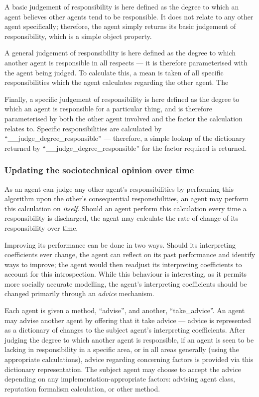 A basic judgement of responsibility is here defined as the degree to which an agent believes other agents tend to be responsible. It does not relate to any other agent specifically; therefore, the agent simply returns its basic judgement of responsibility, which is a simple object property.\par

A general judgement of responsibility is here defined as the degree to which another agent is responsible in all respects --- it is therefore parameterised with the agent being judged. To calculate this, a mean is taken of all specific responsibilities which the agent calculates regarding the other agent. The \par

Finally, a specific judgement of responsibility is here defined as the degree to which an agent is responsible for a particular thing, and is therefore parameterised by both the other agent involved and the factor the calculation relates to. Specific responsibilities are calculated by ``\_\_judge\_degree\_responsible'' --- therefore, a simple lookup of the dictionary returned by ``\_\_judge\_degree\_responsible'' for the factor required is returned.

\subsubsection{Updating the sociotechnical opinion over time}
As an agent can judge any other agent's responsibilities by performing this algorithm upon the other's consequential responsibilities, an agent may perform this calculation on \emph{itself}. Should an agent perform this calculation every time a responsibility is discharged, the agent may calculate the rate of change of its responsibility over time.\par

Improving its performance can be done in two ways. Should its interpreting coefficients ever change, the agent can reflect on its past performance and identify ways to improve; the agent would then readjust its interpreting coefficients to account for this introspection. While this behaviour is interesting, as it permits more socially accurate modelling, the agent's interpreting coefficients should be changed primarily through an \emph{advice} mechanism.\par

Each agent is given a method, ``advise'', and another, ``take\_advice''. An agent may advise another agent by offering that it take advice --- advice is represented as a dictionary of changes to the subject agent's interpreting coefficients. After judging the degree to which another agent is responsible, if an agent is seen to be lacking in responsibility in a specific area, or in all areas generally (using the appropriate calculations), advice regarding concerning factors is provided via this dictionary representation. The subject agent may choose to accept the advice depending on any implementation-appropriate factors: advising agent class, reputation formalism calculation, or other method.\par

